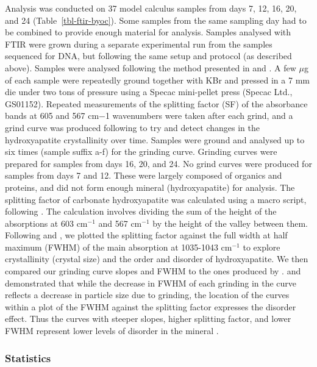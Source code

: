 \documentclass[10pt,a4paper]{article}
\begin{document}
Analysis was conducted on 37 model calculus samples from days 7, 12, 16,
20, and 24 (Table~\ref{tbl-ftir-byoc}). Some samples from the same
sampling day had to be combined to provide enough material for analysis.
Samples analysed with FTIR were grown during a separate experimental run
from the samples sequenced for DNA, but following the same setup and
protocol (as described above). Samples were analysed following the
method presented in \citet{asscherAtomicDisorder2011} and
\citet{asscherVariationsAtomic2011}. A few \(\mu\)g of each sample were
repeatedly ground together with KBr and pressed in a 7 mm die under two
tons of pressure using a Specac mini-pellet press (Specac Ltd.,
GS01152). Repeated measurements of the splitting factor (SF) of the
absorbance bands at 605 and 567 cm−1 wavenumbers were taken after each
grind, and a grind curve was produced following
\citet{asscherAtomicDisorder2011} to try and detect changes in the
hydroxyapatite crystallinity over time. Samples were ground and analysed
up to six times (sample suffix a-f) for the grinding curve. Grinding
curves were prepared for samples from days 16, 20, and 24. No grind
curves were produced for samples from days 7 and 12. These were largely
composed of organics and proteins, and did not form enough mineral
(hydroxyapatite) for analysis. The splitting factor of carbonate
hydroxyapatite was calculated using a macro script, following
\citet{weinerStatesPreservation1990}. The calculation involves dividing
the sum of the height of the absorptions at 603 cm\(^{-1}\) and 567
cm\(^{-1}\) by the height of the valley between them. Following
\citet{asscherAtomicDisorder2011} and
\citet{asscherVariationsAtomic2011}, we plotted the splitting factor
against the full width at half maximum (FWHM) of the main absorption at
1035-1043 cm\(^{-1}\) to explore crystallinity (crystal size) and the
order and disorder of hydroxyapatite. We then compared our grinding
curve slopes and FWHM to the ones produced by
\citet{asscherVariationsAtomic2011}. \citet{asscherVariationsAtomic2011}
and \citet{asscherAtomicDisorder2011} demonstrated that while the
decrease in FWHM of each grinding in the curve reflects a decrease in
particle size due to grinding, the location of the curves within a plot
of the FWHM against the splitting factor expresses the disorder effect.
Thus the curves with steeper slopes, higher splitting factor, and lower
FWHM represent lower levels of disorder in the mineral \citep[Figure 2
in][]{asscherVariationsAtomic2011}.

\subsubsection{Statistics}\label{statistics}
\end{document}
